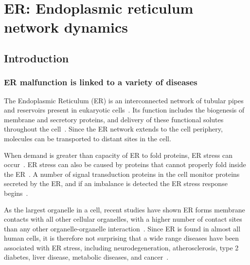 \chapter{ER: Endoplasmic reticulum network dynamics} \label{chap:ER}



\ifpdf
    \graphicspath{{Chapter5/Figs/Raster/}{Chapter5/Figs/PDF/}{Chapter5/Figs/}}
\else
    \graphicspath{{Chapter5/Figs/Vector/}{Chapter5/Figs/}}
\fi

%

\section{Introduction} 
\subsection{ER malfunction is linked to a variety of diseases}
The Endoplasmic Reticulum (ER) is an interconnected network of tubular pipes and reservoirs present in eukaryotic cells~\cite{alberts2002molecular}.
Its function includes the biogenesis of membrane and secretory proteins, and delivery of these functional solutes throughout the cell~\cite{dyson1978cell}.
Since the ER network extends to the cell periphery, molecules can be transported to distant sites in the cell.

When demand is greater than capacity of ER to fold proteins, ER stress can occur~\cite{oakes2015role}.
ER stress can also be caused by proteins that cannot properly fold inside the ER~\cite{rao2004misfolded}.
A number of signal transduction proteins in the cell monitor proteins secreted by the ER, and if an imbalance is detected the ER stress response begins~\cite{oakes2015role}.

As the largest organelle in a cell, recent studies have shown ER forms membrane contacts with all other cellular organelles, with a higher number of contact sites than any other organelle-organelle interaction~\cite{phillips2016structure, valm2017applying}. 
Since ER is found in almost all human cells, it is therefore not surprising that a wide range diseases have been associated with ER stress, including neurodegeneration, atherosclerosis, type 2 diabetes, liver disease, metabolic diseases, and cancer~\cite{oakes2015role, ozcan2012role}.

